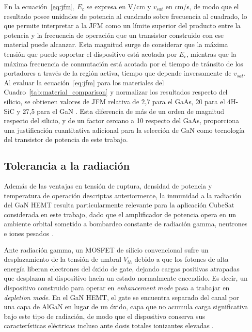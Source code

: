 En la ecuación~\eqref{eq:jfm}, $E_c$ se expresa en V/cm y $v_{sat}$ en cm/s, de modo que el resultado posee unidades de potencia al cuadrado sobre frecuencia al cuadrado, lo que permite interpretar a la JFM como un límite superior del producto entre la potencia y la frecuencia de operación que un transistor construido con ese material puede alcanzar. Esta magnitud surge de considerar que la máxima tensión que puede soportar el dispositivo está acotada por $E_c$, mientras que la máxima frecuencia de conmutación está acotada por el tiempo de tránsito de los portadores a través de la región activa, tiempo que depende inversamente de $v_{sat}$. Al evaluar la ecuación~\eqref{eq:jfm} para los materiales del Cuadro~\ref{tab:material_comparison} y normalizar los resultados respecto del silicio, se obtienen valores de JFM relativa de 2{,}7 para el GaAs, 20 para el 4H-SiC y 27{,}5 para el GaN \cite{mishra2008}. Esta diferencia de más de un orden de magnitud respecto del silicio, y de un factor cercano a 10 respecto del GaAs, proporciona una justificación cuantitativa adicional para la selección de GaN como tecnología del transistor de potencia de este trabajo.

\subsection{Tolerancia a la radiación}
Además de las ventajas en tensión de ruptura, densidad de potencia y temperatura de operación descriptas anteriormente, la inmunidad a la radiación del GaN HEMT resulta particularmente relevante para la aplicación CubeSat considerada en este trabajo, dado que el amplificador de potencia opera en un ambiente orbital sometido a bombardeo constante de radiación gamma, neutrones e iones pesados \cite{epcspace2022}.

Ante radiación gamma, un MOSFET de silicio convencional sufre un desplazamiento de la tensión de umbral $V_{th}$ debido a que los fotones de alta energía liberan electrones del óxido de gate, dejando cargas positivas atrapadas que desplazan al dispositivo hacia un estado normalmente encendido. Es decir, un dispositivo construido para operar en \textit{enhancement mode} pasa a trabajar en \textit{depletion mode}. En el GaN HEMT, el gate se encuentra separado del canal por una capa de AlGaN en lugar de un óxido, capa que no acumula carga significativa bajo este tipo de radiación, de modo que el dispositivo conserva sus características eléctricas incluso ante dosis totales ionizantes elevadas \cite{epcspace2022}.

